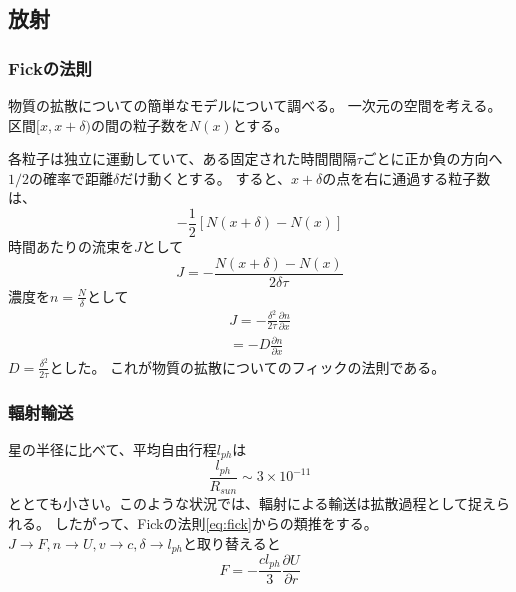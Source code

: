 \documentclass[a4j, dvipdfmx]{jsarticle}
\newcommand{\pder}[2][]{\frac{\partial#1}{\partial#2}}
\newcommand{\half}{\frac{1}{2}}
\newcommand{\beq}{\begin{equation}}
\newcommand{\eeq}{\end{equation}}
\begin{document}
\subsection{放射}
\subsubsection{Fickの法則}
物質の拡散についての簡単なモデルについて調べる。
一次元の空間を考える。区間$[x, x +\delta)$の間の粒子数を$N(x)$とする。
\begin{center}\label{tikz:fick}\end{center}

各粒子は独立に運動していて、ある固定された時間間隔$\tau$ごとに正か負の方向へ$1/2$の確率で距離$\delta$だけ動くとする。
すると、$x+\delta $の点を右に通過する粒子数は、
\beq
- \half \left[N(x + \delta) - N(x)\right]
\eeq
時間あたりの流束を$J$として
\beq
J = - \frac{N(x + \delta) - N(x)}{2\delta \tau}
\eeq
濃度を$n = \frac{N}{\delta}$として
\begin{align}
    J = - \frac{\delta^2}{2\tau} \pder[n]{x}\\
    = - D \pder[n]{x}\label{eq:fick}
\end{align}
$D = \frac{\delta^2}{2\tau}$とした。
これが物質の拡散についてのフィックの法則である。
\subsubsection{輻射輸送}
星の半径に比べて、平均自由行程$l_{ph}$は
\beq
\frac{l_{ph}}{R_{sun}} \sim 3 \times 10^{-11}
\eeq
ととても小さい。このような状況では、輻射による輸送は拡散過程として捉えられる。
したがって、Fickの法則\eqref{eq:fick}からの類推をする。
$J \rightarrow F, n \rightarrow U, v \rightarrow c, \delta \rightarrow l_{ph}$と取り替えると
\beq
F = - \frac{c l_{ph}}{3}\pder[U]{r}
\eeq
\end{document}
